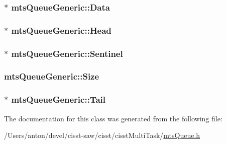 \subsubsection[{Data}]{$\ast$ mts\+Queue\+Generic\+::\+Data\hspace{0.3cm}{\ttfamily [protected]}}\label{classmts_queue_generic_a0507afc9cf7884640baff2df53ed93ea}
\hypertarget{classmts_queue_generic_aab4eea6a40fa92da11b717f656a0e115}{}
\subsubsection[{Head}]{$\ast$ mts\+Queue\+Generic\+::\+Head\hspace{0.3cm}{\ttfamily [protected]}}\label{classmts_queue_generic_aab4eea6a40fa92da11b717f656a0e115}
\hypertarget{classmts_queue_generic_af8b2c1f7982cd66fa6b48481bca7b029}{}
\subsubsection[{Sentinel}]{$\ast$ mts\+Queue\+Generic\+::\+Sentinel\hspace{0.3cm}{\ttfamily [protected]}}\label{classmts_queue_generic_af8b2c1f7982cd66fa6b48481bca7b029}
\hypertarget{classmts_queue_generic_a5ac0990984482842ee9dcdf7e27e04ff}{}
\subsubsection[{Size}]{ mts\+Queue\+Generic\+::\+Size\hspace{0.3cm}{\ttfamily [protected]}}\label{classmts_queue_generic_a5ac0990984482842ee9dcdf7e27e04ff}
\hypertarget{classmts_queue_generic_a892964deb939b83138b69b9b852e1f7d}{}
\subsubsection[{Tail}]{$\ast$ mts\+Queue\+Generic\+::\+Tail\hspace{0.3cm}{\ttfamily [protected]}}\label{classmts_queue_generic_a892964deb939b83138b69b9b852e1f7d}


The documentation for this class was generated from the following file\+:\begin{DoxyCompactItemize}
\item 
/\+Users/anton/devel/cisst-\/saw/cisst/cisst\+Multi\+Task/\hyperlink{mts_queue_8h}{mts\+Queue.\+h}\end{DoxyCompactItemize}
